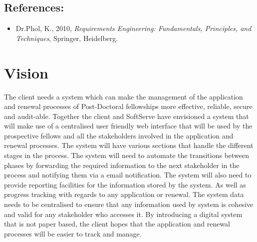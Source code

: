 \documentclass[12pt]{article}
\begin{document}
		\subsection{References:}
		\vspace{0.1in}
		\begin{itemize}
			\item Dr.Phol, K., 2010, \textit{Requirements Engineering: Fundamentals, Principles, and Techniques}, Springer, Heidelberg.
		\end{itemize}			
	
	\vspace{0.5in}
	
	\section{Vision} %
	\vspace{0.2in}
	The client needs a system which can make the management of the application and renewal processes of Post-Doctoral fellowships more effective, reliable, secure and audit-able. Together the client and SoftServe have envisioned a system that will make use of a centralised user friendly web interface that will be used by the prospective fellows and all the stakeholders involved in the application and renewal processes. The system will have various sections that handle the different stages in the process. The system will need to automate the transitions between phases by forwarding the required information to the next stakeholder in the process and notifying them via a email notification. The system will also need to provide reporting facilities for the information stored by the system. As well as progress tracking with regards to any application or renewal. The system data needs to be centralised to ensure that any information used by system is cohesive and valid for any stakeholder who accesses it. By introducing a digital system that is not paper based, the client hopes that the application and renewal processes will be easier to track and manage.
	\vspace{0.5in}
	
\end{document}
